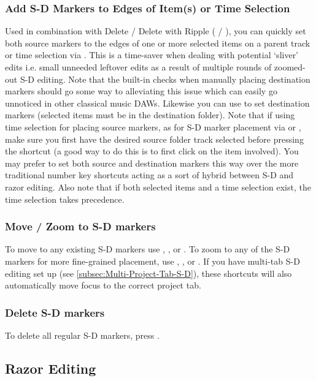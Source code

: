 \documentclass[10pt,american]{article}
\begin{document}
\subsubsection{Add S-D Markers to Edges of Item(s) or Time Selection}

Used in combination with Delete / Delete with Ripple (\keys{\ctrl+\backspace} /
\keys{\backspace}), you can quickly set both source markers to the edges of one
or more selected items on a parent track or time selection via . This
is a time-saver when dealing with potential `sliver' edits i.e. small unneeded
leftover edits as a result of multiple rounds of zoomed-out S-D editing. Note
that the built-in checks when manually placing destination markers should go
some way to alleviating this issue which can easily go unnoticed in other
classical music DAWs. Likewise you can use  to set destination
markers (selected items must be in the destination folder). Note that if using
time selection for placing source markers, as for S-D marker placement via
 or , make sure you first have the desired source folder track
selected before pressing the shortcut (a good way to do this is to first click
on the item involved). You may prefer to set both source and destination markers
this way over the more traditional number key shortcuts acting as a sort of
hybrid between S-D and razor editing. Also note that if both selected items and
a time selection exist, the time selection takes precedence.

\subsubsection{Move / Zoom to S-D markers}

To move to any existing S-D markers use , ,  or
. To zoom to any of the S-D markers for more fine-grained placement, use
, ,  or . If you have multi-tab S-D editing
set up (see \ref{subsec:Multi-Project-Tab-S-D}), these shortcuts will also
automatically move focus to the correct project tab. 

\subsubsection{Delete S-D markers}

To delete all regular S-D markers, press \keys{\ctrl+\del}.

\subsection{Razor Editing}
\end{document}
